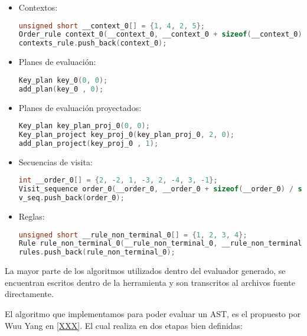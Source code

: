 \begin{itemize}
\item Contextos:
\begin{lstlisting}[language=C++, basicstyle=\scriptsize, columns=fullflexible, linewidth=14cm]
unsigned short __context_0[] = {1, 4, 2, 5};
Order_rule context_0(__context_0, __context_0 + sizeof(__context_0) / sizeof(unsigned short));
contexts_rule.push_back(context_0);
\end{lstlisting}

\item Planes de evaluación:
\begin{lstlisting}[language=C++, basicstyle=\scriptsize, columns=fullflexible, linewidth=9cm]
Key_plan key_0(0, 0);
add_plan(key_0 , 0);
\end{lstlisting}

\item Planes de evaluación proyectados:
\begin{lstlisting}[language=C++, basicstyle=\scriptsize, columns=fullflexible, linewidth=9cm]
Key_plan key_plan_proj_0(0, 0);
Key_plan_project key_proj_0(key_plan_proj_0, 2, 0);
add_plan_project(key_proj_0 , 1);
\end{lstlisting}

\item Secuencias de visita:
\begin{lstlisting}[language=C++, basicstyle=\scriptsize, columns=fullflexible, linewidth=12cm]
int __order_0[] = {2, -2, 1, -3, 2, -4, 3, -1};
Visit_sequence order_0(__order_0, __order_0 + sizeof(__order_0) / sizeof(int));
v_seq.push_back(order_0);
\end{lstlisting}

\item Reglas:
\begin{lstlisting}[language=C++, basicstyle=\scriptsize, columns=fullflexible, columns=fullflexible]
unsigned short __rule_non_terminal_0[] = {1, 2, 3, 4};
Rule rule_non_terminal_0(__rule_non_terminal_0, __rule_non_terminal_0 + sizeof(__rule_non_terminal_0) / sizeof(unsigned short));
rules.push_back(rule_non_terminal_0);
\end{lstlisting}
\end{itemize}

La mayor parte de los algoritmos utilizados dentro del evaluador generado, se encuentran escritos dentro de la herramienta y son transcritos al archivos fuente directamente.

El algoritmo que implementamos para poder evaluar un AST, es el propuesto por Wuu Yang en \ref{XXX}. El cual realiza en dos etapas bien definidas:

